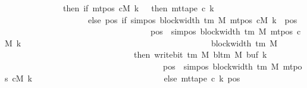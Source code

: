 \begin{isabellebody}
\ \ \ \ \ \ \ \ \ \ \ \ \ \ then\ {\isacharparenleft}{\kern0pt}if\ mt{\isacharunderscore}{\kern0pt}pos\ cM\ k\ {\isacharequal}{\kern0pt}\ {}\ then\ mt{\isacharunderscore}{\kern0pt}tape\ c{}\ k\isanewline
\ \ \ \ \ \ \ \ \ \ \ \ \ \ \ \ \ \ \ \ else\ {\isacharparenleft}{\kern0pt}{\isasymlambda}pos{\isachardot}{\kern0pt}\ if\ sim{\isacharunderscore}{\kern0pt}pos\ {\isacharparenleft}{\kern0pt}block{\isacharunderscore}{\kern0pt}width\ {\isacharparenleft}{\kern0pt}{\isasymGamma}{\isacharunderscore}{\kern0pt}tm\ M{\isacharparenright}{\kern0pt}{\isacharparenright}{\kern0pt}\ {\isacharparenleft}{\kern0pt}mt{\isacharunderscore}{\kern0pt}pos\ cM\ k{\isacharparenright}{\kern0pt}\ {\isasymle}\ pos\isanewline
\ \ \ \ \ \ \ \ \ \ \ \ \ \ \ \ \ \ \ \ \ \ \ \ \ \ \ \ \ \ \ \ \ \ {\isasymand}\ pos\ {\isacharless}{\kern0pt}\ sim{\isacharunderscore}{\kern0pt}pos\ {\isacharparenleft}{\kern0pt}block{\isacharunderscore}{\kern0pt}width\ {\isacharparenleft}{\kern0pt}{\isasymGamma}{\isacharunderscore}{\kern0pt}tm\ M{\isacharparenright}{\kern0pt}{\isacharparenright}{\kern0pt}\ {\isacharparenleft}{\kern0pt}mt{\isacharunderscore}{\kern0pt}pos\ cM\ k{\isacharparenright}{\kern0pt}\isanewline
\ \ \ \ \ \ \ \ \ \ \ \ \ \ \ \ \ \ \ \ \ \ \ \ \ \ \ \ \ \ \ \ \ \ \ \ \ \ \ \ \ \ \ \ {\isacharplus}{\kern0pt}\ block{\isacharunderscore}{\kern0pt}width\ {\isacharparenleft}{\kern0pt}{\isasymGamma}{\isacharunderscore}{\kern0pt}tm\ M{\isacharparenright}{\kern0pt}\isanewline
\ \ \ \ \ \ \ \ \ \ \ \ \ \ \ \ \ \ \ \ \ \ \ \ \ \ \ \ \ \ \ then\ write{\isacharunderscore}{\kern0pt}bit\ {\isacharparenleft}{\kern0pt}{\isasymGamma}{\isacharunderscore}{\kern0pt}tm\ M{\isacharparenright}{\kern0pt}\ {\isacharparenleft}{\kern0pt}bl{\isacharunderscore}{\kern0pt}tm\ M{\isacharparenright}{\kern0pt}\ {\isacharparenleft}{\kern0pt}buf\ k{\isacharparenright}{\kern0pt}\isanewline
\ \ \ \ \ \ \ \ \ \ \ \ \ \ \ \ \ \ \ \ \ \ \ \ \ \ \ \ \ \ \ \ \ \ \ \ \ \ {\isacharparenleft}{\kern0pt}pos\ {\isacharminus}{\kern0pt}\ sim{\isacharunderscore}{\kern0pt}pos\ {\isacharparenleft}{\kern0pt}block{\isacharunderscore}{\kern0pt}width\ {\isacharparenleft}{\kern0pt}{\isasymGamma}{\isacharunderscore}{\kern0pt}tm\ M{\isacharparenright}{\kern0pt}{\isacharparenright}{\kern0pt}\ {\isacharparenleft}{\kern0pt}mt{\isacharunderscore}{\kern0pt}pos\ cM\ k{\isacharparenright}{\kern0pt}{\isacharparenright}{\kern0pt}\isanewline
\ \ \ \ \ \ \ \ \ \ \ \ \ \ \ \ \ \ \ \ \ \ \ \ \ \ \ \ \ \ \ else\ mt{\isacharunderscore}{\kern0pt}tape\ c{}\ k\ pos{\isacharparenright}{\kern0pt}{\isacharparenright}{\kern0pt}\isanewline

\end{isabellebody}
